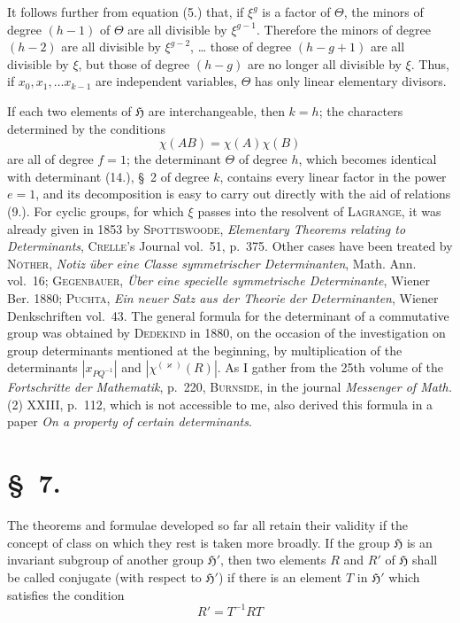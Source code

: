 \documentclass[11pt]{article}
\newcommand{\grp}{\mathfrak{H}}
\begin{document}
It follows further from equation (5.) that, if $\xi^g$ is a factor of $\Theta$, the minors of degree $(h-1)$ of $\Theta$ are all divisible by $\xi^{g-1}$. Therefore the minors of degree $(h-2)$ are all divisible by $\xi^{g-2}$, \ldots{} those of degree $(h-g+1)$ are all divisible by $\xi$, but those of degree $(h-g)$ are no longer all divisible by $\xi$. Thus, if $x_0,x_1,\ldots x_{k-1}$ are independent variables, $\Theta$ has only linear elementary divisors.

If each two elements of $\grp$ are interchangeable, then $k=h$; the characters determined by the conditions
\begin{equation*}\tag{9.}
\chi(AB)=\chi(A)\chi(B)
\end{equation*}
are all of degree $f=1$; the determinant $\Theta$ of degree $h$, which becomes identical with determinant (14.), \S~2 of degree $k$, contains every linear factor in the power $e=1$, and its decomposition is easy to carry out directly with the aid of relations (9.). For cyclic groups, for which $\xi$ passes into the resolvent of \textsc{Lagrange}, it was already given in 1853 by \textsc{Spottiswoode}, \emph{Elementary Theorems relating to Determinants}, \textsc{Crelle}'s Journal vol.~51, p.~375. Other cases have been treated by \textsc{Nöther}, \emph{Notiz über eine Classe symmetrischer Determinanten}, Math. Ann. vol.~16; \textsc{Gegenbauer}, \emph{Über eine specielle symmetrische Determinante}, Wiener Ber. 1880; \textsc{Puchta}, \emph{Ein neuer Satz aus der Theorie der Determinanten}, Wiener Denkschriften vol.~43. The general formula for the determinant of a commutative group was obtained by \textsc{Dedekind} in 1880, on the occasion of the investigation on group determinants mentioned at the beginning, by multiplication of the determinants $\left|x_{PQ^{-1}}\right|$ and $\left|\chi^{(\varkappa)}(R)\right|$. As I gather from the 25th volume of the \emph{Fortschritte der Mathematik}, p.~220, \textsc{Burnside}, in the journal \emph{Messenger of Math.} (2) XXIII, p.~112, which is not accessible to me, also derived this formula in a paper \emph{On a property of certain determinants}.

\section*{\S~7.}

The theorems and formulae developed so far all retain their validity if the concept of class on which they rest is taken more broadly. If the group $\grp$ is an invariant subgroup of another group $\grp'$, then two elements $R$ and $R'$ of $\grp$ shall be called conjugate (with respect to $\grp'$) if there is an element $T$ in $\grp'$ which satisfies the condition
\begin{equation*}\tag{1.}
R'=T^{-1}RT
\end{equation*}
\end{document}
